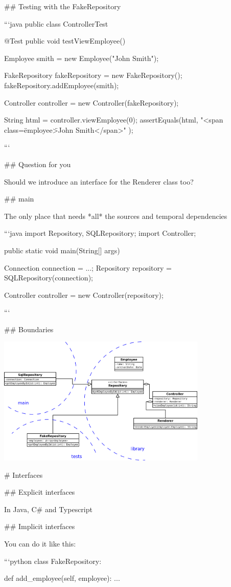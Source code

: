 {{## Testing with the FakeRepository

\small

```java
public class ControllerTest {
    @Test
    public void testViewEmployee() {
        Employee smith = new Employee("John Smith");

        FakeRepository fakeRepository = new FakeRepository();
        fakeRepository.addEmployee(smith);

        Controller controller = new Controller(fakeRepository);

        String html = controller.viewEmployee(0);
        assertEquals(html,
            "<span class=\"employee\">John Smith</span>"
        );
    }
}
```

## Question for you

Should we introduce an interface for the Renderer class too?

## main

The only place that needs *all* the sources and temporal dependencies


```java
import Repository, SQLRepository;
import Controller;

public static void main(String[] args) {
    Connection connection = ...;
    Repository repository = SQLRepository(connection);

    Controller controller = new Controller(repository);
}
```

## Boundaries

\includegraphics[width=10cm]{img/uml/boundaries.png}

# Interfaces

## Explicit interfaces

In Java, C# and Typescript

## Implicit interfaces

You can do it like this:

```python
class FakeRepository:

    def add_employee(self, employee):
        ...

}}
